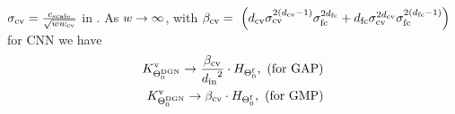 \begin{theorem}\label{th:main} $\sigcnn=\frac{\cscale}{\sqrt{w\wconv}}$  in . As $w\ra\infty$, with  $\bcnn = \ \left(\dconv \sigcnn^{2(\dconv-1)}\sigfc^{2\dfc}+\dfc \sigcnn^{2\dconv}\sigfc^{2(\dfc-1)}\right)$ for CNN we have
\begin{align*}
\kv_{\Tdgn_0}\ra \frac{\bcnn}{{\din}^2} \cdot H_{\Tf_0},\,\,\text{(for GAP)}\\
\kv_{\Tdgn_0}\ra {\bcnn} \cdot H_{\Tf_0},\,\,\text{(for GMP)}\\
\end{align*}
\end{theorem}

